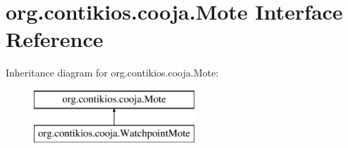 \hypertarget{interfaceorg_1_1contikios_1_1cooja_1_1Mote}{\section{org.\-contikios.\-cooja.\-Mote Interface Reference}
\label{interfaceorg_1_1contikios_1_1cooja_1_1Mote}
}
Inheritance diagram for org.\-contikios.\-cooja.\-Mote\-:\begin{figure}[H]
\begin{center}
\leavevmode
\includegraphics[height=2.000000cm]{interfaceorg_1_1contikios_1_1cooja_1_1Mote}
\end{center}
\end{figure}
